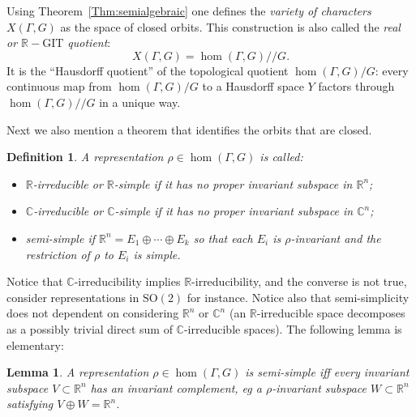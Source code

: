 \documentclass[a4paper,11pt]{article}
\newtheorem{Definition}[Theorem]{Definition}
\newtheorem{Lemma}[Theorem]{Lemma}
\begin{document}
Using  Theorem~\ref{Thm:semialgebraic} one defines
 the \emph{variety of characters} $X(\Gamma, G)$ as the space of closed orbits.
 This construction
 is also called the \emph{real or 
$\mathbb R-\mathrm{GIT}$ quotient}:
 $$
X(\Gamma, G)=
\hom( \Gamma, G )/\!/ G.
$$
It is the ``Hausdorff quotient'' of the  topological quotient
$ \hom( \Gamma, G )/ G $:
every continuous map from
$ \hom( \Gamma, G )/ G $
to a Hausdorff space $ Y$
factors through $
\hom( \Gamma, G )/\!/ G
$ in a unique way.

 Next we also mention a theorem that identifies the orbits that are closed.
 



\begin{Definition}
 A representation $\rho\in 
\hom( \Gamma, G )$ is called:
\begin{itemize}
 \item $\mathbb R$-\emph{irreducible}
or $\mathbb R$-\emph{simple}
if it has 
no proper invariant  subspace in $\mathbb R^n$;
 \item $\mathbb C$-\emph{irreducible}
or $\mathbb C$-\emph{simple}
if it has 
no proper invariant  subspace in $\mathbb C^n$;
 \item  \emph{semi-simple}
if $\mathbb R^n=E_1\oplus\cdots\oplus E_k$ so that each $E_i$ is $\rho$-invariant and the restriction of $\rho$ to $E_i$ is simple.
\end{itemize}
\end{Definition}

Notice that $\mathbb C$-irreducibility implies 
 $\mathbb R$-irreducibility, and the converse is not true,   consider
 representations in $\mathrm{SO}(2)$ for instance.
 Notice also that semi-simplicity does not dependent on considering  
 $\mathbb R^n$ or  $\mathbb C^n$ (an $\mathbb R$-irreducible space 
 decomposes
 as a possibly trivial direct sum of $\mathbb C$-irreducible spaces).
 The following 
 lemma is elementary:

 
\begin{Lemma}
\label{Lemma:semisimple}
 A representation $\rho\in\hom(\Gamma, G)$ is semi-simple
 iff every invariant subspace $V\subset\mathbb R^n$ has an invariant complement,
 eg a $\rho$-invariant subspace $W\subset\mathbb R^n$ satisfying 
 $V\oplus W= \mathbb R^n$.
\end{Lemma}
 
\end{document}
